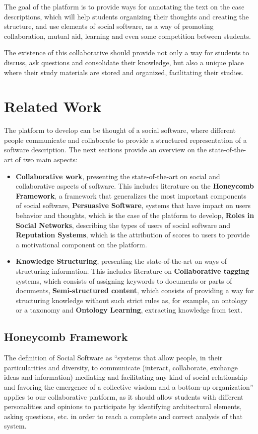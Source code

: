 \documentclass{llncs}
\begin{document}
The goal of the platform is to provide ways for annotating the text on the case descriptions, which will help students organizing their thoughts and creating the structure, and use elements of social software, as a way of promoting collaboration, mutual aid, learning and even some competition between students.
 
The existence of this collaborative should provide not only a way for students to discuss, ask questions and consolidate their knowledge, but also a unique place where their study materials are stored and organized, facilitating their studies.

\section{Related Work}
\label{relatedWork}
The platform to develop can be thought of a social software, where different people communicate and collaborate to provide a structured representation of a software description.
The next sections provide an overview on the state-of-the-art of two main aspects:
\begin{itemize}
\item \textbf{Collaborative work}, presenting the state-of-the-art on social and collaborative aspects of software. This includes literature on the \textbf{Honeycomb Framework}, a framework that generalizes the most important components of social software, \textbf{Persuasive Software}, systems that have impact on users behavior and thoughts, which is the case of the platform to develop, \textbf{Roles in Social Networks}, describing the types of users of social software and \textbf{Reputation Systems}, which is the attribution of scores to users to provide a motivational component on the platform.
	
\item \textbf{Knowledge Structuring}, presenting the state-of-the-art on ways of structuring information. This includes literature on \textbf{Collaborative tagging }systems, which consists of assigning keywords to documents or parts of documents, \textbf{Semi-structured content}, which consists of providing a way for structuring knowledge without such strict rules as, for example, an ontology or a taxonomy and \textbf{Ontology Learning}, extracting knowledge from text.
\end{itemize}

\subsection{Honeycomb Framework}
The definition of Social Software as ``systems that allow people, in their particularities and diversity, to communicate (interact, collaborate, exchange ideas and information) mediating and facilitating any kind of social relationship and favoring the emergence of a collective wisdom and a bottom-up organization'' \cite{pereira2010social} applies to our collaborative platform, as it should allow students with different personalities and opinions to participate by identifying architectural elements, asking questions, etc. in order to reach a complete and correct analysis of that system. 
\end{document}
